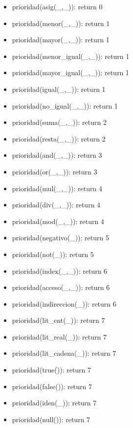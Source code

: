 \documentclass[11pt]{article}
\begin{document}
\begin{itemize}
            \item prioridad(asig(\_,\_)): return 0
            \item prioridad(menor(\_,\_)): return 1
            \item prioridad(mayor(\_,\_)): return 1
            \item prioridad(menor\_igual(\_,\_)): return 1
            \item prioridad(mayor\_igual(\_,\_)): return 1
            \item prioridad(igual(\_,\_)): return 1
            \item prioridad(no\_igual(\_,\_)): return 1
            \item prioridad(suma(\_,\_)): return 2
            \item prioridad(resta(\_,\_)): return 2
            \item prioridad(and(\_,\_)): return 3
            \item prioridad(or(\_,\_)): return 3
            \item prioridad(mul(\_,\_)): return 4
            \item prioridad(div(\_,\_)): return 4
            \item prioridad(mod(\_,\_)): return 4
            \item prioridad(negativo(\_)): return 5
            \item prioridad(not(\_)): return 5
            \item prioridad(index(\_,\_)): return 6
            \item prioridad(acceso(\_,\_)): return 6
            \item prioridad(indireccion(\_)): return 6
            \item prioridad(lit\_ent(\_)): return 7
            \item prioridad(lit\_real(\_)): return 7
            \item prioridad(lit\_cadena(\_)): return 7
            \item prioridad(true()): return 7
            \item prioridad(false()): return 7
            \item prioridad(iden(\_)): return 7
            \item prioridad(null()): return 7
        \end{itemize}
    
\end{document}
